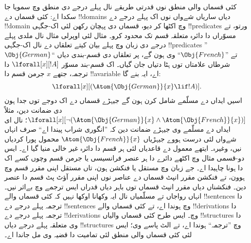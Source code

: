 \documentclass[../../../include/open-logic-section]{subfiles}
\begin{document}
کئی قسماں والی منطق نوں قدرتی طریقے نال پہلے درجے
دی منطق وچ سمویا جا سکدا اے: کئی قسماں دے
!!{domain}s دیاں ساریاں شےواں نوں اک پہلے درجے دے
!!{domain} وچ اکٹھا کر دیو، قسماں دی پہچان رکھن
لئی اک-جگہی !!{predicate}s ورتو، تے مسوّراں دا
دائرہ متعلقہ قسم تک محدود کرو۔ مثال لئی اوپرلی
مثال نال ملدی پہلے درجے دی زبان وچ پہلے بیان
کیتے تعلقاں دے نال اک-جگہی !!{predicate}s
”$\Obj{German}$“ تے ”$\Obj{French}$“ وی ہون گے،
پر تعلقاں دی قسم-بندی دیاں شرطاں علامتاں توں
ہٹا دتیاں جان گیاں۔ اک قسم-بند مسوّر
$\lforall[x][!A]$ دا ترجمہ، جتھے $x$ جرمن
قسم دا !!a{variable} اے، ایہ بنے گا:
\[
\lforall[x][(\Atom{\Obj{German}}{x} \lif !A)].
\]
اسیں ایداں دے مسلّمے شامل کرن ہون گے جیہڑے
قسماں دے اک دوجے توں جدا ہون دی ضمانت دین،
مثلاً $\lforall[x][\lnot (\Atom{\Obj{German}}{x} \land
  \Atom{\Obj{French}}{x})]$؛ نال ای ایداں دے
مسلّمے وی جیہڑے ضمانت دین کہ ”انگوری شراب پیندا اے“
صرف انہاں شےواں لئی درست ہووے جیہڑیاں
$\Atom{\Obj{French}}{x}$ محمول پورا کردیاں نیں،
وغیرہ۔
ایتھے معمول دے قاعدیاں لئی ہر قسم دا دائرہ غیر خالی
منیا گیا اے۔ ایس دو-قسمی مثال وچ اکٹھے دائرے دا ہر
عنصر فرانسیسی یا جرمن قسم وچوں کسے اک دا ہونا چاہیدا
اے۔ جے زبان وچ مستقل یا فنکشن ہون، تاں مستقل اپنی
مقرر قسم وچ ہوون، تے فنکشن مقرر انپٹ قسماں دے عناصر
نوں اپنی مقرر آؤٹ پٹ قسم دا عنصر دین۔ فنکشناں دیاں
مقرر انپٹ قسماں توں باہر دیاں قدراں ایس ترجمے وچ
بےاثر نیں۔ انہاں رواجاں تے مسلّمیاں نال ایہ وکھانا
اوکھا نہیں کہ کئی قسماں والے !!{sentence}s دا
ترجمہ پہلے درجے دے !!{sentence}s وچ ہوندا اے،
تے کئی قسماں والے !!{derivation}s دا ترجمہ
پہلے درجے دے !!{derivation}s وچ۔ ایس طرح کئی
قسماں والیاں !!{structure}s دا وی متعلقہ پہلے
درجے دیاں !!{structure}s وچ ”ترجمہ“ ہوندا اے،
تے الٹ پاسے وی؛ ایس لئی کئی قسماں والی منطق
لئی تمامیت دا قضیہ وی مل جاندا اے۔
\end{document}
